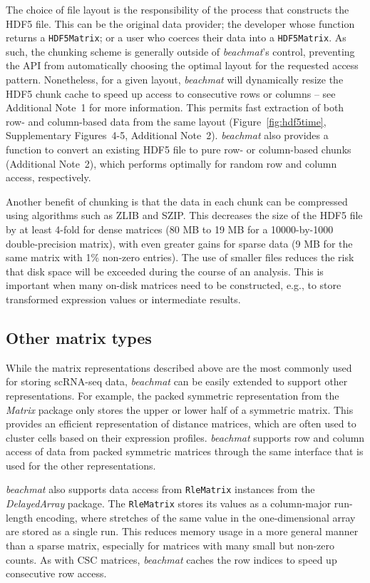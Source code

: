 \documentclass[10pt,letterpaper]{article}
\newcommand{\beachmat}{\textit{beachmat}}
\newcommand{\code}[1]{\texttt{#1}}
\newcommand{\suppfighdflayout}{4-5}
\newcommand{\suppseclayoutoptim}{1}
\newcommand{\suppseclayouttest}{2}
\begin{document}
The choice of file layout is the responsibility of the process that constructs the HDF5 file.
This can be the original data provider; the developer whose function returns a \code{HDF5Matrix}; or a user who coerces their data into a \code{HDF5Matrix}.
As such, the chunking scheme is generally outside of \beachmat{}'s control, preventing the API from automatically choosing the optimal layout for the requested access pattern.
Nonetheless, for a given layout, \beachmat{} will dynamically resize the HDF5 chunk cache to speed up access to consecutive rows or columns -- see Additional Note~\suppseclayoutoptim{} for more information.
This permits fast extraction of both row- and column-based data from the same layout (Figure~\ref{fig:hdf5time}, Supplementary Figures~\suppfighdflayout{}, Additional Note~\suppseclayouttest{}).
\beachmat{} also provides a function to convert an existing HDF5 file to pure row- or column-based chunks (Additional Note~\suppseclayouttest{}), which performs optimally for random row and column access, respectively.

Another benefit of chunking is that the data in each chunk can be compressed using algorithms such as ZLIB and SZIP.
This decreases the size of the HDF5 file by at least 4-fold for dense matrices (80 MB to 19 MB for a 10000-by-1000 double-precision matrix), with even greater gains for sparse data (9 MB for the same matrix with 1\% non-zero entries).
The use of smaller files reduces the risk that disk space will be exceeded during the course of an analysis.
This is important when many on-disk matrices need to be constructed, e.g., to store transformed expression values or intermediate results.

\subsection*{Other matrix types}
While the matrix representations described above are the most commonly used for storing scRNA-seq data, \beachmat{} can be easily extended to support other representations.
For example, the packed symmetric representation from the \textit{Matrix} package only stores the upper or lower half of a symmetric matrix.
This provides an efficient representation of distance matrices, which are often used to cluster cells based on their expression profiles.
\beachmat{} supports row and column access of data from packed symmetric matrices through the same interface that is used for the other representations.

\beachmat{} also supports data access from \code{RleMatrix} instances from the \textit{DelayedArray} package.
The \code{RleMatrix} stores its values as a column-major run-length encoding, where stretches of the same value in the one-dimensional array are stored as a single run.
This reduces memory usage in a more general manner than a sparse matrix, especially for matrices with many small but non-zero counts.
As with CSC matrices, \beachmat{} caches the row indices to speed up consecutive row access.
\end{document}
